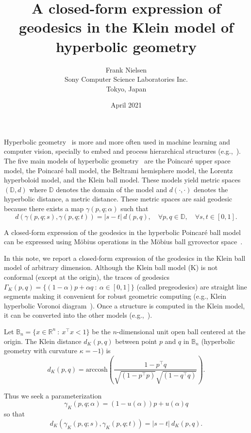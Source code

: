 \documentclass[11pt]{article}
\title{A closed-form expression of geodesics in the Klein model of hyperbolic geometry}
\author{Frank Nielsen\\ Sony Computer Science Laboratories Inc.\\ Tokyo, Japan}
\date{April 2021}
\def\bbR{\mathbb{R}}
\def\bbR{\mathbb{R}}
\def\bbD{\mathbb{D}}
\def\bbB{\mathbb{B}}
\def\arccosh{\mathrm{arccosh}}
\begin{document}
\maketitle

Hyperbolic geometry~\cite{cannon1997hyperbolic} is more and more often used in machine learning and computer vision, specially to embed and process hierarchical structures (e.g.,~\cite{suris2021hyperfuture,shimizu2020hyperbolic}).
The five main models of hyperbolic geometry~\cite{cannon1997hyperbolic} are the Poincar\'e upper space model, the Poincar\'e ball model, the Beltrami hemisphere model, the Lorentz hyperboloid model, and the Klein ball model.
These models yield metric spaces $(\bbD,d)$ where $\bbD$ denotes the domain of the model and $d(\cdot,\cdot)$ denotes the  hyperbolic distance, a metric distance.
These metric spaces are said geodesic because there exists a map $\gamma(p,q;\alpha)$ such that
$$
d\left(\gamma(p,q;s),\gamma(p,q;t)\right) = |s-t|\ d(p,q),\quad \forall p,q\in\bbD,\quad \forall s,t\in [0,1].
$$

A closed-form expression of the geodesics in the hyperbolic Poincar\'e ball model can be expressed
using M\"obius operations in the M\"obius ball gyrovector space~\cite{PoincareGeodesics-2001,shimizu2020hyperbolic}.

In this note, we report a closed-form expression of the geodesics in the Klein ball model of arbitrary dimension.
Although the Klein ball model (K) is not conformal (except at the origin), the traces of  geodesics 
$\Gamma_K(p,q)=\{(1-\alpha)p+\alpha q\ :\ \alpha\in [0,1]\}$ (called pregeodesics)
are straight line segments making it convenient for robust geometric computing (e.g., Klein hyperbolic Voronoi diagram~\cite{HVD-2010,nielsen2012hyperbolic}).
Once a structure is computed in the Klein model, it can be converted into the other models (e.g.,~\cite{HVD-2014}).

Let $\bbB_n=\{ x\in\bbR^n\ :\  x^\top x<1\}$ be the $n$-dimensional unit open ball centered at the origin.
The Klein distance $d_K(p,q)$ between point $p$ and $q$ in $\bbB_n$ (hyperbolic geometry with curvature $\kappa=-1$) is
$$
d_K(p,q)=  \arccosh \left( \frac{1-p^\top q}{\sqrt{(1-p^\top p)}\sqrt{(1-q^\top q)}} \right).
$$

Thus we seek a parameterization 
\begin{equation}
\gamma_K(p,q;\alpha)= (1-u(\alpha)) p + u(\alpha)q
\end{equation}
so that 
$$
d_K\left(\gamma_K(p,q;s),\gamma_K(p,q;t)\right) = |s-t|\ d_K(p,q).
$$
\end{document}
